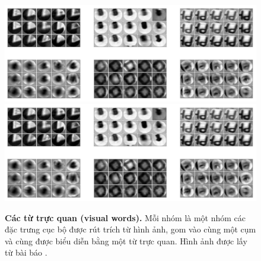 \begin{figure}[!htbp]
  \begin{center}
    \leavevmode
    \ifpdf
      \includegraphics[scale=0.32]{visualWords}
    \else
      \includegraphics[scale=0.32]{visualWords}
    \fi
    \caption[Các từ trực quan (visual words)]{\textbf{Các từ trực quan (visual words).} Mỗi nhóm là một nhóm các đặc trưng cục bộ được rút trích từ hình ảnh, gom vào cùng một cụm và cùng được biểu diễn bằng một từ trực quan. Hình ảnh được lấy từ bài báo \cite{sivic2009efficient}.}
    \label{FigVisualWords}
  \end{center}
\end{figure}
